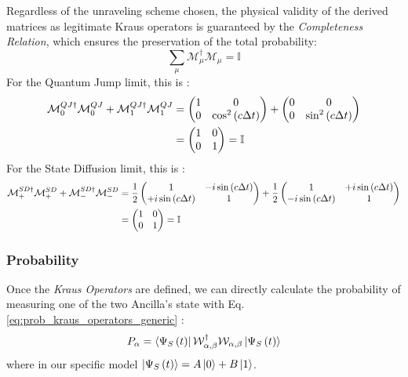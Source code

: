 \documentclass[a4paper,12pt]{article}
\begin{document}
Regardless of the unraveling scheme chosen, the physical validity of the derived matrices as legitimate Kraus operators is guaranteed by the \textit{Completeness Relation}, which ensures the preservation of the total probability:
\begin{equation}
	\sum_{\mu} \mathcal{M}_{\mu}^{\dagger} \mathcal{M}_{\mu} = \mathbb{I}
	\label{eq:completeness_relation_PE}
\end{equation}
For the Quantum Jump limit, this is :
\begin{align}
	\mathcal{M}_{0}^{QJ \dagger} \mathcal{M}_{0}^{QJ} + \mathcal{M}_{1}^{QJ \dagger} \mathcal{M}_{1}^{QJ} &= 
	\begin{pmatrix} 1 & 0 \\ 0 & \cos^2{\left(c \Delta t \right)} \end{pmatrix} + 
	\begin{pmatrix} 0 & 0 \\ 0 & \sin^2{\left(c \Delta t \right)} \end{pmatrix} \notag \\
	&= \begin{pmatrix} 1 & 0 \\ 0 & 1 \end{pmatrix} = \mathbb{I}
\end{align}
For the State Diffusion limit, this is :
\begin{align}
	\mathcal{M}_{+}^{SD \dagger} \mathcal{M}_{+}^{SD} + \mathcal{M}_{-}^{SD \dagger} \mathcal{M}_{-}^{SD} &= \frac{1}{2} \begin{pmatrix} 1 & -i \sin \left(c \Delta t \right) \\ +i \sin \left(c \Delta t \right) & 1 \end{pmatrix} + \frac{1}{2} \begin{pmatrix} 1 & +i \sin \left(c \Delta t \right) \\ -i \sin \left(c \Delta t \right) & 1 \end{pmatrix} \notag \\
	&= \begin{pmatrix} 1 & 0 \\ 0 & 1 \end{pmatrix} = \mathbb{I} 
\end{align}

\subsubsection{Probability}
\label{subsub:probability_PE}
Once the \textit{Kraus Operators} are defined, we can directly calculate the probability of measuring one of the two Ancilla's state with Eq.\ref{eq:prob_kraus_operators_generic} :
\begin{equation}
	P_{\alpha} = \bra{\Psi_{S} \left( t \right)} \mathcal{W}_{\alpha, \beta}^{\dagger} \mathcal{W}_{\alpha, \beta} \ket{\Psi_{S} \left( t \right)} 
\end{equation}
where in our specific model $ \ket{\Psi_{S} \left( t \right)} = A \ket{0} + B \ket{1} $.
\end{document}
